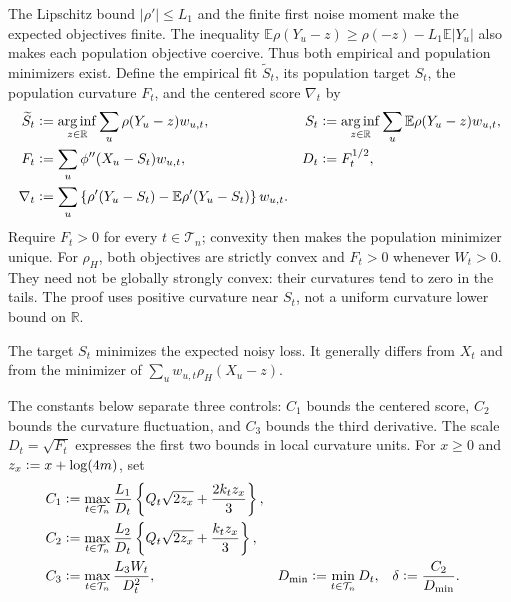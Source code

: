 \documentclass[11pt]{article}
\newcommand{\E}{\mathbb{E}}
\newcommand{\R}{\mathbb{R}}
\newcommand{\eqdef}{\mathrel{\vcentcolon=}}
\newcommand{\arginf}{\mathop{\mathrm{arg\,inf}}}
\newcommand{\rhohu}{\rho}
\newcommand{\rhohum}{\phi}
\newcommand{\Signal}{X}
\newcommand{\Data}{Y}
\newcommand{\IMFs}{S}
\newcommand{\IMFt}{\widetilde S}
\newcommand{\IF}{F}
\newcommand{\DFN}{D}
\newcommand{\xx}{x}
\begin{document}
The Lipschitz bound \(|\rho'|\leq L_1\) and the finite first noise moment make
the expected objectives finite.  The inequality
\(\E\rho(Y_u-z)\geq\rho(-z)-L_1\E|Y_u|\) also makes each population
objective coercive.  Thus both empirical and population minimizers exist.
Define the empirical fit \(\widetilde S_t\), its population target
\(S_t\), the population curvature \(F_t\), and the centered score
\(\nabla_t\) by
\begin{align}
  \IMFt_t
  &\eqdef \arginf_{z\in\R}\sum_u\rhohu(\Data_u-z)w_{u,t},
  &
  \IMFs_t
  &\eqdef \arginf_{z\in\R}\sum_u\E\rhohu(\Data_u-z)w_{u,t},
  \label{eq:estimators}\\
  \IF_t
  &\eqdef\sum_u\rhohum''(\Signal_u-\IMFs_t)w_{u,t},
  &
  \DFN_t
  &\eqdef\IF_t^{1/2},
  \label{eq:curvature}\\
  \nabla_t
  &\eqdef\sum_u\left\{
       \rhohu'(\Data_u-\IMFs_t)
       -\E\rhohu'(\Data_u-\IMFs_t)
     \right\}w_{u,t}.
  \label{eq:nabla}
\end{align}
Require \(\IF_t>0\) for every \(t\in\mathcal T_n\); convexity then makes the
population minimizer unique.  For \(\rho_H\), both objectives are strictly
convex and \(\IF_t>0\) whenever \(W_t>0\).  They need not be globally strongly
convex: their curvatures tend to zero in the tails.  The proof uses positive
curvature near \(S_t\), not a uniform curvature lower bound on \(\R\).

The target \(S_t\) minimizes the expected noisy loss.  It generally differs
from \(X_t\) and from the minimizer of \(\sum_u w_{u,t}\rho_H(X_u-z)\).

The constants below separate three controls: \(C_1\) bounds the centered
score, \(C_2\) bounds the curvature fluctuation, and \(C_3\) bounds the third
derivative.  The scale \(D_t=\sqrt{F_t}\) expresses the first two bounds in
local curvature units.  For \(\xx\geq0\) and
\(z_{\xx}\eqdef\xx+\log(4m)\), set
\begin{align}
  C_1
  &\eqdef
    \max_{t\in\mathcal T_n}
    \frac{L_1}{\DFN_t}
    \left\{Q_t\sqrt{2z_{\xx}}+\frac{2k_tz_{\xx}}{3}\right\},
  \label{eq:C1}\\
  C_2
  &\eqdef
    \max_{t\in\mathcal T_n}
    \frac{L_2}{\DFN_t}
    \left\{Q_t\sqrt{2z_{\xx}}+\frac{k_tz_{\xx}}{3}\right\},
  \label{eq:C2}\\
  C_3
  &\eqdef
    \max_{t\in\mathcal T_n}\frac{L_3W_t}{\DFN_t^2},
  &
  \DFN_{\min}
  &\eqdef\min_{t\in\mathcal T_n}\DFN_t,
  &
  \delta
  &\eqdef\frac{C_2}{\DFN_{\min}}.
  \label{eq:C3-delta}
\end{align}
\end{document}
